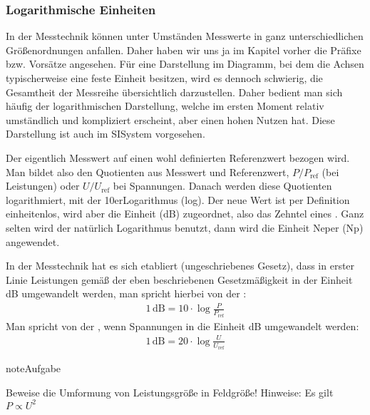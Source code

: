 \documentclass[letterpaper,10pt,english]{jupyterBook}
\begin{document}
\sphinxAtStartPar
{}


\subsubsection{Logarithmische Einheiten}
\label{\detokenize{content/0_Basics:logarithmische-einheiten}}
\sphinxAtStartPar


\sphinxAtStartPar
In der Messtechnik können unter Umständen Messwerte in ganz unterschiedlichen Größenordnungen anfallen. Daher haben wir uns ja im Kapitel vorher die Präfixe bzw. Vorsätze angesehen. Für eine Darstellung im Diagramm, bei dem die Achsen typischerweise eine feste Einheit besitzen, wird es dennoch schwierig, die Gesamtheit der Messreihe übersichtlich darzustellen. Daher bedient man sich häufig der logarithmischen Darstellung, welche im ersten Moment relativ umständlich und kompliziert erscheint, aber einen hohen Nutzen hat. Diese Darstellung ist auch im SI\sphinxhyphen{}System vorgesehen.

\sphinxAtStartPar
Der eigentlich Messwert auf einen wohl definierten Referenzwert bezogen wird. Man bildet also den Quotienten aus Messwert und Referenzwert, \(P/P_\mathrm{ref}\) (bei Leistungen) oder \(U/U_\mathrm{ref}\) bei Spannungen. Danach werden diese Quotienten logarithmiert,  mit der 10er\sphinxhyphen{}Logarithmus (log). Der neue Wert ist per Definition einheitenlos, wird aber die Einheit  (dB) zugeordnet, also das Zehntel eines . Ganz selten wird der natürlich Logarithmus benutzt, dann wird die Einheit Neper (Np) angewendet.

\sphinxAtStartPar
In der Messtechnik hat es sich etabliert (ungeschriebenes Gesetz), dass in erster Linie Leistungen gemäß der eben beschriebenen Gesetzmäßigkeit in der Einheit dB umgewandelt werden, man spricht hierbei von der :
\begin{equation*}
\begin{split}1\,\mathrm{dB} = 10 \cdot \log\frac{P}{P_\mathrm{ref}}\end{split}
\end{equation*}
\sphinxAtStartPar
Man spricht von der , wenn Spannungen in die Einheit dB umgewandelt werden:
\begin{equation*}
\begin{split}1\,\mathrm{dB} = 20 \cdot \log\frac{U}{U_\mathrm{ref}}\end{split}
\end{equation*}
\begin{sphinxadmonition}{note}{Aufgabe}

\sphinxAtStartPar
Beweise die Umformung von Leistungsgröße in Feldgröße! Hinweise: Es gilt \(P \propto U^2\)
\end{sphinxadmonition}
\end{document}
